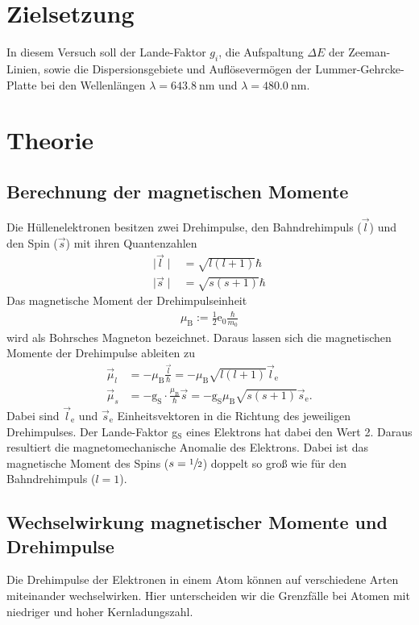 \section{Zielsetzung}
\label{sec:Zielsetzung}
In diesem Versuch soll der Lande-Faktor $g_i$, die Aufspaltung $\Delta E$ der
Zeeman-Linien, sowie die Dispersionsgebiete und Auflösevermögen der
Lummer-Gehrcke-Platte bei den Wellenlängen $\lambda = \SI{643.8}{\nano\meter}$
und $\lambda = \SI{480.0}{\nano\meter}$.

\section{Theorie}
\label{sec:Theorie}
\subsection{Berechnung der magnetischen Momente}
\label{sec:Berechnung_magnetischer_Momente}
Die Hüllenelektronen besitzen zwei Drehimpulse, den Bahndrehimpuls ($\vec{l}$)
und den
Spin ($\vec{s}$) mit ihren Quantenzahlen
\begin{align}
  \mid\vec{l}\mid &= \sqrt{l\left(l+1\right)}\hbar \\
  \mid\vec{s}\mid &= \sqrt{s\left(s+1\right)}\hbar
  \label{eqn:Quantenzahlen}
\end{align}
Das magnetische Moment der Drehimpulseinheit \hbar
\begin{align}
  \mu_\text{B} := \frac{1}{2}\text{e}_0 \frac{\hbar}{m_0}
  \label{eqn:bohr}
\end{align}
wird als Bohrsches Magneton bezeichnet. Daraus lassen sich die magnetischen
Momente der Drehimpulse ableiten zu
\begin{align}
  \vec{\mu}_l &= -\mu_\text{B} \frac{\vec{l}}{\hbar} = -\mu_\text{B} \sqrt{l\left(l+1 \right)} \vec{l}_\text{e}\\
  \vec{\mu}_s &= -\text{g}_\text{S} \cdot \frac{\mu_\text{B}}{\hbar} \vec{s} = -\text{g}_\text{S} \mu_\text{B}\sqrt{s\left(s+1 \right)} \vec{s}_\text{e}.
  \label{eqn:momente}
\end{align}
Dabei sind $\vec{l}_\text{e}$ und $\vec{s}_\text{e}$ Einheitsvektoren in die Richtung
des jeweiligen Drehimpulses.
Der Lande-Faktor g$_\text{S}$ eines Elektrons hat dabei den Wert 2. Daraus resultiert die
magnetomechanische Anomalie des Elektrons. Dabei ist das magnetische Moment des
Spins ($s = \sfrac{\num{1}}{\num{2}}$) doppelt so groß wie für den Bahndrehimpuls
($l = \num{1}$).

\subsection{Wechselwirkung magnetischer Momente und Drehimpulse}
\label{sec:Wechselwirkungen}
Die Drehimpulse der Elektronen in einem Atom können auf verschiedene Arten
miteinander wechselwirken. Hier unterscheiden wir die Grenzfälle bei Atomen mit
niedriger und hoher Kernladungszahl.

